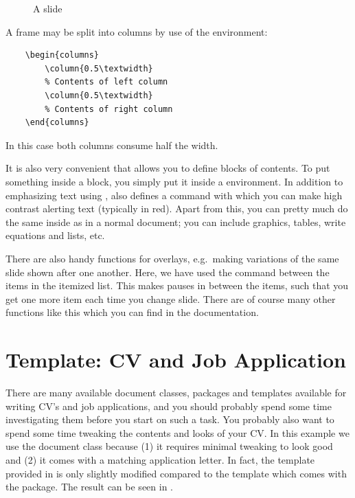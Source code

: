 {\begin{figure}
	\centering
	{%
		\setlength{\fboxsep}{0pt}%
	}%
	\caption{A \beamer{} slide}
	\label{fig:latex:beamer}
\end{figure}

A frame may be split into columns by use of the  environment:

\begin{verbatim}
	\begin{columns}
		\column{0.5\textwidth}
		% Contents of left column
		\column{0.5\textwidth}
		% Contents of right column
	\end{columns}
\end{verbatim}
In this case both columns consume half the width.

It is also very convenient that \beamer{} allows you to define blocks of contents. To put something inside a block, you simply put it inside a  environment. In addition to emphasizing text using \latexin{\emph}, \beamer{} also defines a command \latexin{\alert} with which you can make high contrast alerting text (typically in red). Apart from this, you can pretty much do the same inside \beamer{} as in a normal document; you can include graphics, tables, write equations and lists, etc.

There are also handy functions for overlays, e.g.\ making variations of the same slide shown after one another. Here, we have used the \latexin{\pause} command between the items in the itemized list. This makes pauses in between the items, such that you get one more item each time you change slide. There are of course many other functions like this which you can find in the documentation.


\section{Template: CV and Job Application}
There are many available document classes, packages and templates available for writing CV's and job applications, and you should probably spend some time investigating them before you start on such a task. You probably also want to spend some time tweaking the contents and looks of your CV. In this example we use the  document class because (1) it requires minimal tweaking to look good and (2) it comes with a matching application letter. In fact, the template provided in  is only slightly modified compared to the template which comes with the package. The result can be seen in .

}
